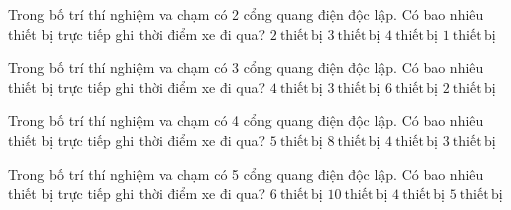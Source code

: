 

\begin{ex}
Trong bố trí thí nghiệm va chạm có 2 cổng quang điện độc lập. Có bao nhiêu thiết bị trực tiếp ghi thời điểm xe đi qua?
\choice
{\True $2\ \mathrm{thiết\,bị}$}
{$3\ \mathrm{thiết\,bị}$}
{$4\ \mathrm{thiết\,bị}$}
{$1\ \mathrm{thiết\,bị}$}
\end{ex}

\begin{ex}
Trong bố trí thí nghiệm va chạm có 3 cổng quang điện độc lập. Có bao nhiêu thiết bị trực tiếp ghi thời điểm xe đi qua?
\choice
{$4\ \mathrm{thiết\,bị}$}
{\True $3\ \mathrm{thiết\,bị}$}
{$6\ \mathrm{thiết\,bị}$}
{$2\ \mathrm{thiết\,bị}$}
\end{ex}

\begin{ex}
Trong bố trí thí nghiệm va chạm có 4 cổng quang điện độc lập. Có bao nhiêu thiết bị trực tiếp ghi thời điểm xe đi qua?
\choice
{$5\ \mathrm{thiết\,bị}$}
{$8\ \mathrm{thiết\,bị}$}
{\True $4\ \mathrm{thiết\,bị}$}
{$3\ \mathrm{thiết\,bị}$}
\end{ex}

\begin{ex}
Trong bố trí thí nghiệm va chạm có 5 cổng quang điện độc lập. Có bao nhiêu thiết bị trực tiếp ghi thời điểm xe đi qua?
\choice
{$6\ \mathrm{thiết\,bị}$}
{$10\ \mathrm{thiết\,bị}$}
{$4\ \mathrm{thiết\,bị}$}
{\True $5\ \mathrm{thiết\,bị}$}
\end{ex}

